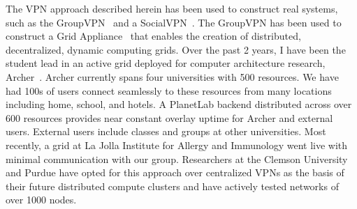 The VPN approach described herein has been used to construct real systems,
such as the GroupVPN~\cite{gridappliance} and a SocialVPN~\cite{cops08}.  The
GroupVPN has been used to construct a Grid Appliance~\cite{grid_appliance} that
enables the creation of distributed, decentralized, dynamic computing grids.
Over the past 2 years, I have been the student lead in an active grid deployed
for computer architecture research, Archer~\cite{archer}.  Archer currently
spans four universities with 500 resources.  We have had 100s of users connect
seamlessly to these resources from many locations including home, school, and
hotels.  A PlanetLab backend distributed across over 600 resources provides
near constant overlay uptime for Archer and external users.  External users
include classes and groups at other universities.  Most recently, a grid at La
Jolla Institute for Allergy and Immunology went live with minimal communication
with our group.  Researchers at the Clemson University and Purdue have opted
for this approach over centralized VPNs as the basis of their future
distributed compute clusters and have actively tested networks of over 1000
nodes.
